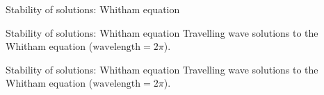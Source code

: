 \begin{frame}[t]{Stability of solutions: Whitham equation}
\end{frame}
\begin{frame}[t]{Stability of solutions: Whitham equation}
Travelling wave solutions to the Whitham equation ($\mbox{wavelength} = 2 \pi$). 

\end{frame}
\begin{frame}[t]{Stability of solutions: Whitham equation}
Travelling wave solutions to the Whitham equation ($\mbox{wavelength} = 2 \pi$). 

\end{frame}
